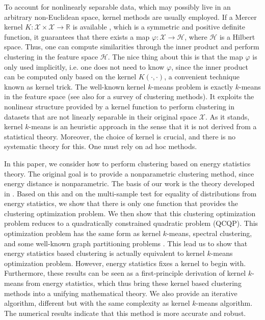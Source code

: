 \documentclass[aps,preprint,nofootinbib,floatfix]{revtex4-1}
\newcommand\kk{K}
\begin{document}
To account for nonlinearly separable data, which may possibly live
in an arbitrary non-Euclidean space, kernel methods are usually employed.
If a Mercer kernel $\kk: \mathcal{X}\times \mathcal{X} \to \mathbb{R}$ 
is available \cite{Mercer}, which is a symmetric and positive definite 
function, it guarantees that there exists a map $\varphi : \mathcal{X} \to
\mathcal{H}$, where $\mathcal{H}$ is a Hilbert space. Thus, one can
compute similarities through the inner product and 
perform clustering in the feature space $\mathcal{H}$. The nice thing
about this is that the map $\varphi$ is only used implicitly, i.e. one
does not need to know $\varphi$, since the inner
product can be computed only based on the kernel $\kk(\cdot, \cdot)$, 
a convenient technique known as kernel trick. The well-known 
kernel $k$-means problem 
is exactly $k$-means in the feature space
\cite{Smola,Girolami} (see also \cite{Filippone} for a survey of clustering
methods). 
It exploits the nonlinear structure provided by
a kernel function to perform clustering in datasets that are not linearly
separable in their original space $\mathcal{X}$.
As it stands, kernel $k$-means is an heuristic approach in the sense that
it is not derived from a statistical theory. Moreover, the choice of
kernel is crucial, and there is no systematic theory for this. One
must rely on ad hoc methods.

In this paper, we consider how to perform clustering based on energy
statistics theory. The original goal is to provide a nonparametric
clustering method, since energy distance is nonparametric.
The basis of our work is the theory developed in 
\cite{Sejdinovic2013}. Based on this and on the multi-sample test
for equality of distributions from energy statistics, we show that
there is only one function that provides the clustering optimization
problem. We then show that this clustering
optimization problem reduces to a quadratically constrained quadratic
problem (QCQP). This optimization problem has the same form as kernel $k$-means,
spectral clustering, and some well-known graph partitioning problems
\cite{Dhillon}. This lead us to show that energy statistics based
clustering is actually equivalent to kernel $k$-means optimization problem.
However, energy statistics fixes a kernel to begin with.
Furthermore, these results can be seen as a first-principle derivation
of kernel $k$-means from energy statistics, which thus bring
these kernel based clustering methods into a unifying mathematical theory.
We also provide an iterative algorithm, different but with the same
complexity as kernel $k$-means algorithm. The numerical results indicate
that this method is more accurate and robust.
\end{document}
